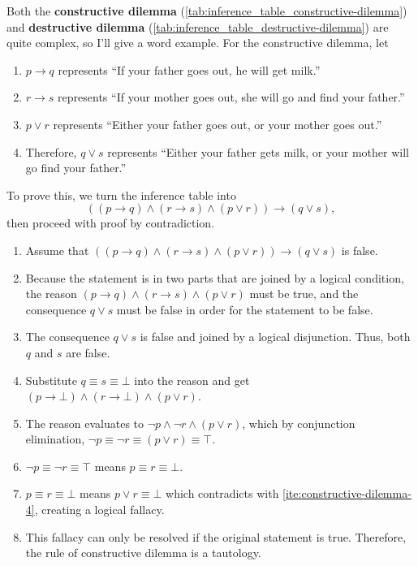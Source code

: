 Both the \textbf{constructive dilemma} (\cref{tab:inference_table_constructive-dilemma}) and \textbf{destructive dilemma} (\cref{tab:inference_table_destructive-dilemma}) are quite complex, so I'll give a word example. For the constructive dilemma, let
\begin{enumerate}[noitemsep]
  \item $p \to q$ represents \enquote{If your father goes out, he will get milk.}
  \item $r \to s$ represents \enquote{If your mother goes out, she will go and find your father.}
  \item $p \lor r$ represents \enquote{Either your father goes out, or your mother goes out.}
  \item Therefore, $q \lor s$ represents \enquote{Either your father gets milk, or your mother will go find your father.}
\end{enumerate}
To prove this, we turn the inference table into
\begin{equation}
  ((p \to q) \land (r \to s) \land (p \lor r)) \to (q \lor s),
\end{equation}
then proceed with proof by contradiction.
\begin{enumerate}[noitemsep]
  \item Assume that $((p \to q) \land (r \to s) \land (p \lor r)) \to (q \lor s)$ is false.
  \item Because the statement is in two parts that are joined by a logical condition, the reason $(p \to q) \land (r \to s) \land (p \lor r)$ must be true, and the consequence $q \lor s$ must be false in order for the statement to be false.
  \item The consequence $q \lor s$ is false and joined by a logical disjunction. Thus, both $q$ and $s$ are false.
  \item Substitute $q \equiv s \equiv \bot$ into the reason and get $(p \to \bot) \land (r \to \bot) \land (p \lor r)$.
  \item\label{ite:constructive-dilemma-4} The reason evaluates to $\neg p \land \neg r \land (p \lor r)$, which by conjunction elimination, $\neg p \equiv \neg r \equiv (p \lor r) \equiv \top$.
  \item $\neg p \equiv \neg r \equiv \top$ means $p \equiv r \equiv \bot$.
  \item $p \equiv r \equiv \bot$ means $p \lor r \equiv \bot$ which contradicts with \cref{ite:constructive-dilemma-4}, creating a logical fallacy.
  \item This fallacy can only be resolved if the original statement is true. Therefore, the rule of constructive dilemma is a tautology.
\end{enumerate}

